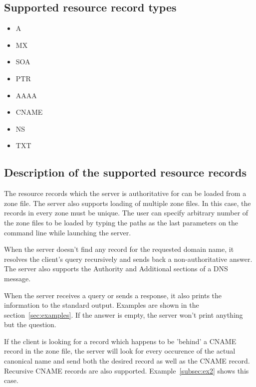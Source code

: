 \documentclass[12pt,a4paper,titlepage,final]{article}
\begin{document}
\subsection{Supported resource record types}
\begin{center}
	\begin{varwidth}[t]{.5\textwidth}
		\begin{itemize}
			\item A
			\item MX
			\item SOA
			\item PTR
		\end{itemize}
	\end{varwidth}
	\hspace{4em}
	\begin{varwidth}[t]{.5\textwidth}
		\begin{itemize}
			\item AAAA
			\item CNAME
			\item NS
			\item TXT
		\end{itemize}
	\end{varwidth}
\end{center}

\subsection{Description of the supported resource records}

The resource records which the server is authoritative for can be loaded from a
zone file. The server also supports loading of multiple zone files. In this
case, the records in every zone must be unique. The user can specify arbitrary
number of the zone files to be loaded by typing the paths as the last parameters
on the command line while launching the server.

When the server doesn't find any record for the requested domain name, it
resolves the client's query recursively and sends back a non-authoritative
answer. The server also supports the Authority and Additional sections of a DNS
message.

When the server receives a query or sends a response, it also prints the
information to the standard output. Examples are shown in the
section~\ref{sec:examples}. If the answer is empty, the server won't print
anything but the question.

If the client is looking for a record which happens to be 'behind' a CNAME
record in the zone file, the server will look for every occurence of the actual
canonical name and send both the desired record as well as the CNAME record.
Recursive CNAME records are also supported. Example~\ref{subsec:ex2} shows this
case.
\end{document}
